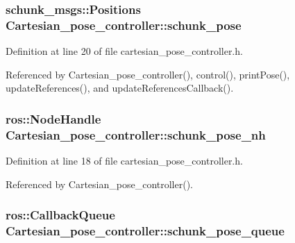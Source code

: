 \hypertarget{classCartesian__pose__controller_a301bc44e901e4837cf036661478354c4}{
\subsubsection[{schunk\-\_\-pose}]{\setlength{\rightskip}{0pt plus 5cm}schunk\-\_\-msgs\-::\-Positions Cartesian\-\_\-pose\-\_\-controller\-::schunk\-\_\-pose\hspace{0.3cm}{\ttfamily [private]}}}\label{classCartesian__pose__controller_a301bc44e901e4837cf036661478354c4}


Definition at line 20 of file cartesian\-\_\-pose\-\_\-controller.\-h.



Referenced by Cartesian\-\_\-pose\-\_\-controller(), control(), print\-Pose(), update\-References(), and update\-References\-Callback().

\hypertarget{classCartesian__pose__controller_a41a692189fed59ec8ec8460539f63c66}{
\subsubsection[{schunk\-\_\-pose\-\_\-nh}]{\setlength{\rightskip}{0pt plus 5cm}ros\-::\-Node\-Handle Cartesian\-\_\-pose\-\_\-controller\-::schunk\-\_\-pose\-\_\-nh\hspace{0.3cm}{\ttfamily [private]}}}\label{classCartesian__pose__controller_a41a692189fed59ec8ec8460539f63c66}


Definition at line 18 of file cartesian\-\_\-pose\-\_\-controller.\-h.



Referenced by Cartesian\-\_\-pose\-\_\-controller().

\hypertarget{classCartesian__pose__controller_a5efe52a57e5239b3fd86ff456e94691b}{
\subsubsection[{schunk\-\_\-pose\-\_\-queue}]{\setlength{\rightskip}{0pt plus 5cm}ros\-::\-Callback\-Queue Cartesian\-\_\-pose\-\_\-controller\-::schunk\-\_\-pose\-\_\-queue\hspace{0.3cm}{\ttfamily [private]}}}\label{classCartesian__pose__controller_a5efe52a57e5239b3fd86ff456e94691b}


